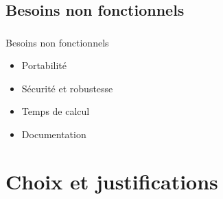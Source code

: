 \documentclass[11pt]{beamer}
\begin{document}
\begin{frame}
	\frametitle{\subsecname}
	\begin{figure}[h]
		\begin{center}
  		\end{center}	
	 \end{figure}
\end{frame}

\subsection{Besoins non fonctionnels}

\begin{frame}
	\frametitle{\subsecname}
	\begin{block}{Besoins non fonctionnels}
		\begin{itemize}
		\item Portabilité
		\item Sécurité et robustesse
		\item Temps de calcul
		\item Documentation
		\end{itemize}
	\end{block}
\end{frame}

\section{Choix et justifications	}	
\end{document}
